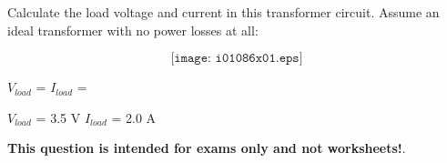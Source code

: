 

Calculate the load voltage and current in this transformer circuit.  Assume an ideal transformer with no power losses at all:

$$\texttt{[image: i01086x01.eps]}$$

$V_{load}$ = \hskip 80pt $I_{load}$ = 

\vskip 10pt







$V_{load}$ = 3.5 V \hskip 80pt $I_{load}$ = 2.0 A







{\bf This question is intended for exams only and not worksheets!}.



